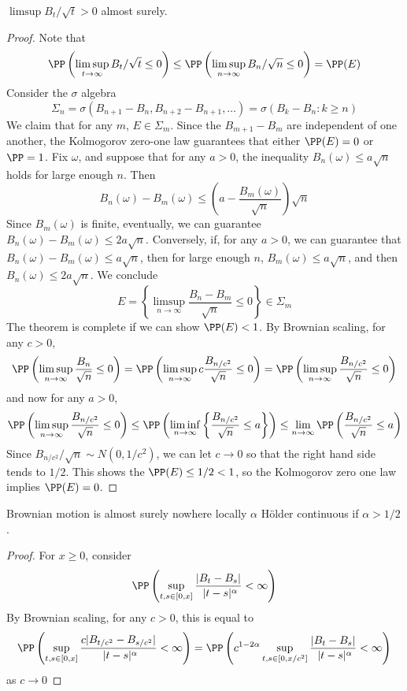 \begin{theorem}
    $\limsup B_t/\sqrt{t} > 0$ almost surely.
\end{theorem}
\begin{proof}
    Note that
    \[ \PP \left( \limsup_{t \to \infty} B_t/\sqrt{t} \leq 0 \right) \leq \PP \left( \limsup_{n \to \infty} B_n/\sqrt{n} \leq 0 \right) = \PP(E) \]
    Consider the $\sigma$ algebra
    \[ \Sigma_n = \sigma(B_{n+1} - B_n, B_{n+2} - B_{n+1}, \dots) = \sigma(B_k - B_n : k \geq n) \]
    We claim that for any $m$, $E \in \Sigma_m$. Since the $B_{m+1} - B_m$ are independent of one another, the Kolmogorov zero-one law guarantees that either $\PP(E) = 0$ or $\PP = 1$. Fix $\omega$, and suppose that for any $a > 0$, the inequality $B_n(\omega) \leq a \sqrt{n}$ holds for large enough $n$. Then
    \[ B_n(\omega) - B_m(\omega) \leq \left( a - \frac{B_m(\omega)}{\sqrt{n}} \right) \sqrt{n} \]
    Since $B_m(\omega)$ is finite, eventually, we can guarantee $B_n(\omega) - B_m(\omega) \leq 2a\sqrt{n}$. Conversely, if, for any $a > 0$, we can guarantee that $B_n(\omega) - B_m(\omega) \leq a\sqrt{n}$, then for large enough $n$, $B_m(\omega) \leq a \sqrt{n}$, and then $B_n(\omega) \leq 2a \sqrt{n}$. We conclude
    \[ E = \left\{ \limsup_{n \to \infty} \frac{B_n - B_m}{\sqrt{n}} \leq 0 \right\} \in \Sigma_m \]
    The theorem is complete if we can show $\PP(E) < 1$. By Brownian scaling, for any $c > 0$,
    \[ \PP \left( \limsup_{n \to \infty} \frac{B_n}{\sqrt{n}} \leq 0 \right) = \PP \left( \limsup_{n \to \infty} c \frac{B_{n/c^2}}{\sqrt{n}} \leq 0 \right) = \PP\left( \limsup_{n \to \infty} \frac{B_{n/c^2}}{\sqrt{n}} \leq 0 \right) \]
    and now for any $a > 0$,
    \[ \PP\left( \limsup_{n \to \infty} \frac{B_{n/c^2}}{\sqrt{n}} \leq 0 \right) \leq \PP \left( \liminf_{n \to \infty} \left\{ \frac{B_{n/c^2}}{\sqrt{n}} \leq a \right\} \right) \leq \lim_{n \to \infty} \PP \left( \frac{B_{n/c^2}}{\sqrt{n}} \leq a \right) \]
    Since $B_{n/c^2}/\sqrt{n} \sim N(0,1/c^2)$, we can let $c \to 0$ so that the right hand side tends to $1/2$. This shows the $\PP(E) \leq 1/2 < 1$, so the Kolmogorov zero one law implies $\PP(E) = 0$.
\end{proof}

\begin{corollary}
    Brownian motion is almost surely nowhere locally $\alpha$ H\"{o}lder continuous if $\alpha > 1/2$.
\end{corollary}
\begin{proof}
    For $x \geq 0$, consider
    \[ \PP \left( \sup_{t,s \in [0,x]} \frac{|B_t - B_s|}{\ |t - s|^\alpha} < \infty \right) \]
    By Brownian scaling, for any $c > 0$, this is equal to
    \[ \PP \left( \sup_{t,s \in [0,x]} \frac{c |B_{t/c^2} - B_{s/c^2}|}{\ |t - s|^\alpha} < \infty \right) = \PP \left( c^{1-2\alpha} \sup_{t,s \in [0,x/c^2]} \frac{|B_t - B_s|}{\ |t - s|^\alpha} < \infty \right) \]
    as $c \to 0$
\end{proof}

